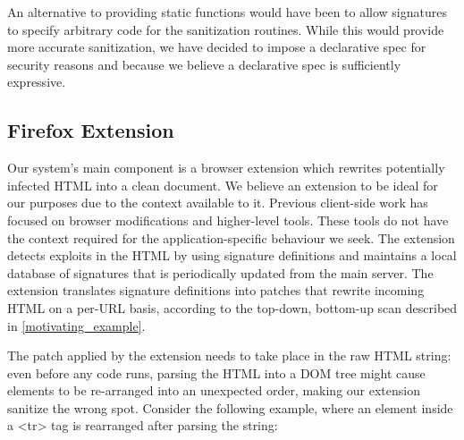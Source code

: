 An alternative to providing static functions would have been to allow signatures to
specify arbitrary code for the sanitization routines. While this would
provide more accurate sanitization, we have decided to
impose a declarative spec for security reasons and because we believe
a declarative spec is sufficiently expressive.

 
 \subsection{Firefox Extension} \label{firefox_extension}
 Our system's main component is a browser extension which rewrites potentially infected HTML into a clean document. We believe an extension to be ideal for our purposes due to the context available to it. Previous client-side work has focused on browser modifications and higher-level tools. These tools do not have the context required for the application-specific behaviour we seek. The extension detects exploits in the HTML by using signature definitions and maintains a local database of signatures that is periodically updated from the main server. The extension translates signature definitions into patches that rewrite incoming HTML on a per-URL basis, according to the top-down, bottom-up scan described in \autoref{motivating_example}. 

The patch applied by the extension needs to take place in the raw HTML string: even before any code runs, parsing the HTML into a DOM tree might cause elements to be re-arranged into an unexpected order, making our extension sanitize the wrong spot. 
Consider the following example, where an element inside a <tr> tag is rearranged after parsing the string:

